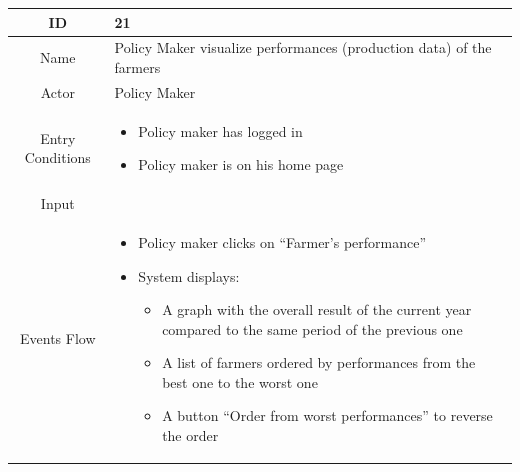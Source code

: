 \documentclass{article}
\begin{document}
\begin{center}
    \begin{longtable}{|c| p{10cm}|}
        \hline
            ID & 21 \\
        \hline
            Name & Policy Maker visualize performances (production data) of the farmers \\
        \hline
            Actor & Policy Maker \\
        \hline
            Entry Conditions &  \begin{itemize}
                                    \item Policy maker has logged in
                                    \item Policy maker is on his home page
                                \end{itemize}\\
        \hline
            Input &  \\
        \hline
            Events Flow &   \begin{itemize}
                                \item Policy maker clicks on “Farmer’s performance” 
                                \item System displays:
                                                \begin{itemize}
                                                    \item A graph with the overall result of the current year compared to the same period of the previous one
                                                    \item A list of farmers ordered by performances from the best one to the worst one 
                                                    \item A button “Order from worst performances” to reverse the order
                                                \end{itemize}


\end{itemize}
\end{longtable}
\end{center}
\end{document}
